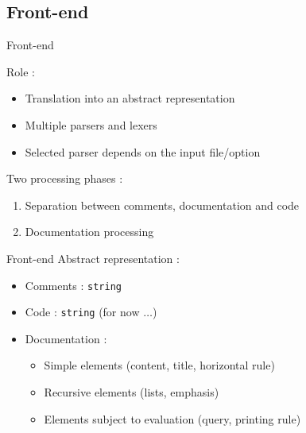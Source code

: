 \documentclass[compress]{beamer}
\newenvironment{tframe}[1]{
  \subsection{#1}
  \begin{frame}{#1}
  }{
  \end{frame}
  }
\begin{document}
  \begin{tframe}{Front-end}
    Role :
    \begin{itemize}
      \item Translation into an abstract representation
      \item Multiple parsers and lexers
      \item Selected parser depends on the input file/option
    \end{itemize}

    \vfill
    Two processing phases :
    \begin{enumerate}
      \item Separation between comments, documentation and code
      \item Documentation processing
    \end{enumerate}
  \end{tframe}
  \begin{frame}{Front-end}
      Abstract representation  :
      \begin{itemize}
        \item Comments : \texttt{string}
        \item Code : \texttt{string} (for now $\ldots$)
        \item Documentation : \\
          \begin{itemize}
            \item Simple elements (content, title, horizontal rule)
            \item Recursive elements (lists, emphasis)
            \item Elements subject to evaluation (query, printing rule)
          \end{itemize}
      \end{itemize}
    \end{frame}
\end{document}
